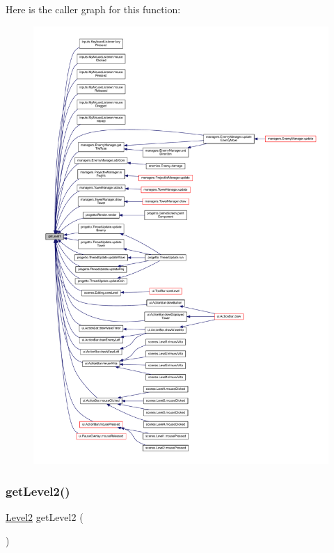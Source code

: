 Here is the caller graph for this function\+:\nopagebreak
\begin{figure}[H]
\begin{center}
\leavevmode
\includegraphics[width=350pt]{classprogetto_1_1_game_a6991f76e58df8f4b9bc8e94e3389d150_icgraph}
\end{center}
\end{figure}
\mbox{\label{classprogetto_1_1_game_a26827f97d382e852c53c15990619c8b7}} 
\subsubsection{\texorpdfstring{get\+Level2()}{getLevel2()}}
{\footnotesize\ttfamily \hyperlink{classscenes_1_1_level2}{Level2} get\+Level2 (\begin{DoxyParamCaption}{ }\end{DoxyParamCaption})}



